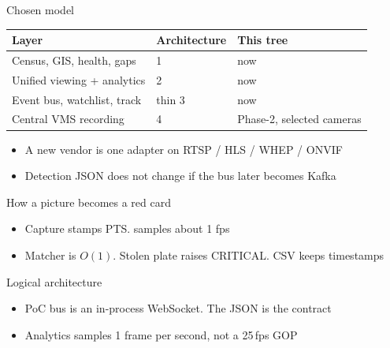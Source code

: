 \documentclass[aspectratio=169,11pt]{beamer}
\begin{document}
\begin{frame}{Chosen model}
\begin{center}
\begin{tabular}{@{}lll@{}}
\toprule
Layer & Architecture & This tree \\
\midrule
Census, GIS, health, gaps & 1 & now \\
Unified viewing + analytics & 2 & now \\
Event bus, watchlist, track & thin 3 & now \\
Central VMS recording & 4 & Phase-2, selected cameras \\
\bottomrule
\end{tabular}
\end{center}
\medskip
\begin{itemize}\itemsep0.55em
\item A new vendor is one adapter on RTSP / HLS / WHEP / ONVIF
\item Detection JSON does not change if the bus later becomes Kafka
\end{itemize}
\end{frame}

\begin{frame}{How a picture becomes a red card}
\begin{center}\resizebox{0.96\textwidth}{!}{}\end{center}
\medskip
\begin{itemize}\itemsep0.45em
\item Capture stamps PTS.  samples about 1 fps
\item Matcher is $O(1)$. Stolen plate raises CRITICAL. CSV keeps timestamps
\end{itemize}
\end{frame}

\begin{frame}{Logical architecture}
\begin{center}\resizebox{0.96\textwidth}{!}{}\end{center}
\medskip
\begin{itemize}\itemsep0.5em
\item PoC bus is an in-process WebSocket. The JSON is the contract
\item Analytics samples 1 frame per second, not a 25\,fps GOP
\end{itemize}
\end{frame}
\end{document}
